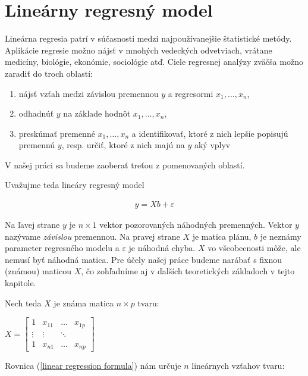 \section{Lineárny regresný model}
\label{linear regression}
 
Lineárna regresia patrí v súčasnosti medzi najpoužívanejšie štatistické metódy. Aplikácie regresie možno nájsť v mnohých vedeckých odvetviach, 
vrátane medicíny, biológie, ekonómie, sociológie atď. Ciele regresnej analýzy zväčša možno zaradiť do troch oblastí:

\begin{enumerate}
  \item nájsť vzťah medzi závislou premennou $y$ a regresormi $x_1, \ldots, x_n$,
  \item odhadnúť $y$ na základe hodnôt $x_1, \ldots, x_n$,
  \item preskúmať premenné $x_1, \ldots, x_n$ a identifikovať, ktoré z nich lepšie popisujú premennú $y$, resp. určiť, ktoré z nich majú na $y$ aký vplyv
\end{enumerate}

V našej práci sa budeme zaoberať treťou z pomenovaných oblastí.

Uvažujme teda lineáry regresný model

\begin{align}
\label{linear regression formula}
y = Xb + \varepsilon
\end{align}

Na ľavej strane $y$ je $n \times 1$ vektor pozorovaných náhodných premenných. Vektor $y$ nazývame \emph{závislou} premennou.
Na pravej strane $X$ je matica plánu, $b$ je neznámy parameter regresného modelu a $\varepsilon$ je náhodná chyba.
$X$ vo všeobecnosti môže, ale nemusí byť náhodná matica. Pre účely našej práce budeme narábať s fixnou (známou) maticou $X$,
čo zohľadníme aj v ďalších teoretických základoch v tejto kapitole.

Nech teda $X$ je známa matica $n \times p$ tvaru:

\begin{center}
$
X =
\begin{bmatrix}
1 & x_{11} & \ldots & x_{1p} \\
\vdots & \vdots & \ddots & \\
1 & x_{n1} & \ldots & x_{np} 
\end{bmatrix}
$
\end{center}

Rovnica (\ref{linear regression formula}) nám určuje $n$ lineárnych vzťahov tvaru:

